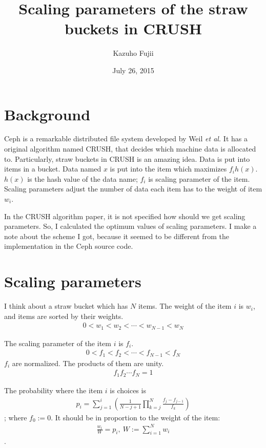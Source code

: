 \documentclass[a4paper,11pt]{article}
\title{Scaling parameters of the straw buckets in CRUSH}
\author{Kazuho Fujii}
\date{July 26, 2015}
\begin{document}
\maketitle

\section{Background}

Ceph is a remarkable distributed file system developed by Weil {\it et al.}
It has a original algorithm named CRUSH,
that decides which machine data is allocated to.
Particularly, straw buckets in CRUSH is an amazing idea.
Data is put into items in a bucket.
Data named $x$ is put into the item which maximizes $f_i h(x)$.
$h(x)$ is the hash value of the data name;
$f_i$ is scaling parameter of the item.
Scaling parameters adjust the number of data each item has to the weight of item $w_i$.

In the CRUSH algorithm paper, it is not specified how should we get scaling parameters.
So, I calculated the optimum values of scaling parameters. 
I make a note about the scheme I got, because it seemed to be different from the implementation in the Ceph source code.

\section{Scaling parameters}

I think about a straw bucket which has $N$ items.
The weight of the item $i$ is $w_i$, and items are sorted by their weights.
\begin{eqnarray}
0 < w_1 < w_2 < \cdots < w_{N-1} < w_N
\end{eqnarray}

The scaling parameter of the item $i$ is $f_i$.
\begin{eqnarray}
0 < f_1 < f_2 < \cdots < f_{N-1} < f_N
\end{eqnarray}
$f_i$ are normalized. The products of them are unity.
\begin{eqnarray}
f_1 f_2 \cdots f_N = 1
\end{eqnarray}


The probability where the item $i$ is choices is
\begin{eqnarray}
p_i = \sum_{j=1}^i \left(
    \frac{1}{N-j+1} \prod_{k=j}^N \frac{f_j - f_{j-1}}{f_k}
\right)
\end{eqnarray}
; where $f_0 := 0$. It should be in proportion to the weight of the item:
\begin{eqnarray}
\frac{w_i}{W} = p_i,\  
W := \sum_{i=1}^N w_i
\end{eqnarray}
.
\end{document}
